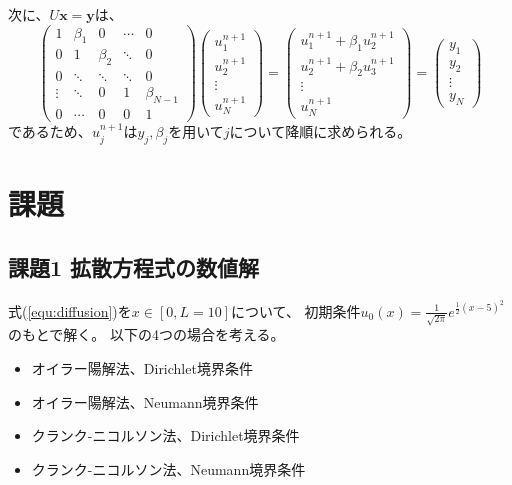 \documentclass[a4j, titlepage]{jsarticle}
\numberwithin{equation}{section}
\begin{document}
        次に、$U\bm{x} = \bm{y}$は、
        \begin{equation*}
            \begin{pmatrix}
                1 & \beta_1 & 0 & \cdots & 0 \\
                0 & 1 & \beta_2 & \ddots & 0 \\
                0 & \ddots & \ddots & \ddots & 0 \\
                \vdots & \ddots & 0 & 1 & \beta_{N - 1} \\
                0 & \cdots & 0 & 0 & 1
            \end{pmatrix}\begin{pmatrix}
                u_1^{n + 1} \\
                u_2^{n + 1} \\
                \vdots \\
                u_N^{n + 1}
            \end{pmatrix} = \begin{pmatrix}
                u_1^{n + 1} + \beta_1u_2^{n + 1} \\
                u_2^{n + 1} + \beta_2u_3^{n + 1} \\
                \vdots \\
                u_N^{n + 1}
            \end{pmatrix} = \begin{pmatrix}
                y_1 \\
                y_2 \\
                \vdots \\
                y_N
            \end{pmatrix}
        \end{equation*}
        であるため、$u_j^{n + 1}$は$y_j, \beta_j$を用いて$j$について降順に求められる。

\section{課題} \label{sec:ex}
    \subsection{課題1 拡散方程式の数値解}
        式(\ref{equ:diffusion})を$x\in[0, L = 10]$について、
        初期条件$u_0(x) = \displaystyle\frac{1}{\sqrt{2\pi}}e^{\frac{1}{2}(x - 5)^2}$
        のもとで解く。
        以下の4つの場合を考える。
        \begin{itemize}
            \item オイラー陽解法、Dirichlet境界条件
            \item オイラー陽解法、Neumann境界条件
            \item クランク-ニコルソン法、Dirichlet境界条件
            \item クランク-ニコルソン法、Neumann境界条件
        \end{itemize}
\end{document}

